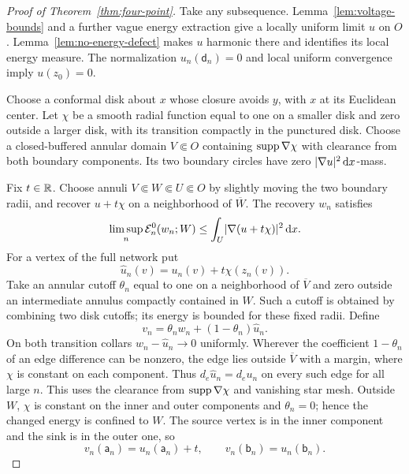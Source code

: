 \begin{proof}[Proof of Theorem~\ref{thm:four-point}]
Take any subsequence.  Lemma~\ref{lem:voltage-bounds} and a further
vague energy extraction give a locally uniform limit \(u\) on \(O\).
Lemma~\ref{lem:no-energy-defect} makes \(u\) harmonic there and identifies
its local energy measure.  The normalization \(u_n(\mathsf d_n)=0\) and local
uniform convergence imply \(u(z_0)=0\).

Choose a conformal disk about \(x\) whose closure avoids \(y\), with
\(x\) at its Euclidean center.  Let \(\chi\) be a smooth radial function
equal to one on a smaller disk and zero outside a larger disk, with
its transition compactly in the punctured disk.  Choose a closed-buffered
annular domain \(V\Subset O\) containing \(\operatorname{supp}\nabla\chi\) with
clearance from both boundary components.  Its two boundary circles
have zero \(\lvert \nabla u\rvert^2\,\mathrm d x\)-mass.

Fix \(t\in\mathbb R\).  Choose annuli \(V\Subset W\Subset U\Subset O\) by
slightly moving the two boundary radii, and recover \(u+t\chi\) on a
neighborhood of \(\overline W\).  The recovery \(w_n\) satisfies
\begin{equation}\label{eq:flux-recovery}
 \limsup_n\mathcal E_n^0(w_n;W)
       \le\int_U\lvert \nabla(u+t\chi)\rvert^2\,\mathrm d x.
\end{equation}
For a vertex of the full network put
\[
                  \widehat u_n(v)=u_n(v)+t\chi(z_n(v)).
\]
Take an annular cutoff \(\theta_n\) equal to one on a neighborhood of
\(\overline V\) and zero outside an intermediate annulus compactly
contained in \(W\).  Such a cutoff is obtained by combining two disk
cutoffs; its energy is bounded for these fixed radii.  Define
\[
                  v_n=\theta_n w_n+(1-\theta_n)\widehat u_n.
\]
On both transition collars \(w_n-\widehat u_n\to0\) uniformly.  Wherever
the coefficient \(1-\theta_n\) of an edge difference can be nonzero,
the edge lies outside \(\overline V\) with a margin, where \(\chi\)
is constant on each component.  Thus
\(d_e\widehat u_n=d_eu_n\) on every such edge for all large \(n\).
This uses the clearance from \(\operatorname{supp}\nabla\chi\) and vanishing star mesh.
Outside \(W\),
\(\chi\) is constant on the inner and outer components and
\(\theta_n=0\); hence the changed energy is confined to \(W\).
The source vertex is in the inner component and the sink is in the
outer one, so
\[
                v_n(\mathsf a_n)=u_n(\mathsf a_n)+t,\qquad
                v_n(\mathsf b_n)=u_n(\mathsf b_n).
\]


\end{proof}
